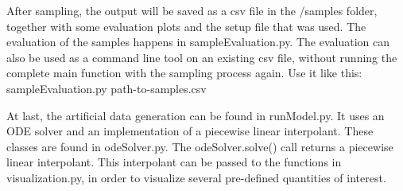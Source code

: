 \documentclass{article}
\begin{document}
After sampling, the output will be saved as a csv file in the 
/samples folder, together with some evaluation plots and the setup file that was used. The evaluation of the samples happens in sampleEvaluation.py. The evaluation can also be used as a command line tool on an existing csv file, without running the complete main function with the sampling process again. Use it like this:
sampleEvaluation.py path-to-samples.csv

At last, the artificial data generation can be found in runModel.py. It uses an ODE solver and an implementation of a piecewise linear interpolant. These classes are found in odeSolver.py. The odeSolver.solve() call returns a piecewise linear interpolant. This interpolant can be passed to the functions in visualization.py, in order to visualize several pre-defined quantities of interest. 



%
%
%
% 
% 
\newpage
\printbibliography
%
\end{document}
